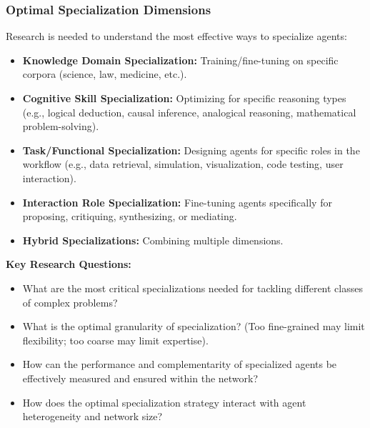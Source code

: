 \documentclass[12pt]{amsart}
\begin{document}
\subsubsection{Optimal Specialization Dimensions}
\label{subsubsec:specialization_strategies}
Research is needed to understand the most effective ways to specialize agents:
\begin{itemize}[leftmargin=*]
    \item \textbf{Knowledge Domain Specialization:} Training/fine-tuning on specific corpora (science, law, medicine, etc.).
    \item \textbf{Cognitive Skill Specialization:} Optimizing for specific reasoning types (e.g., logical deduction, causal inference, analogical reasoning, mathematical problem-solving).
    \item \textbf{Task/Functional Specialization:} Designing agents for specific roles in the workflow (e.g., data retrieval, simulation, visualization, code testing, user interaction).
    \item \textbf{Interaction Role Specialization:} Fine-tuning agents specifically for proposing, critiquing, synthesizing, or mediating.
    \item \textbf{Hybrid Specializations:} Combining multiple dimensions.
\end{itemize}
\textbf{Key Research Questions:}
\begin{itemize}[leftmargin=*, label={--}]
    \item What are the most critical specializations needed for tackling different classes of complex problems?
    \item What is the optimal granularity of specialization? (Too fine-grained may limit flexibility; too coarse may limit expertise).
    \item How can the performance and complementarity of specialized agents be effectively measured and ensured within the network?
    \item How does the optimal specialization strategy interact with agent heterogeneity and network size?
\end{itemize}
\end{document}
